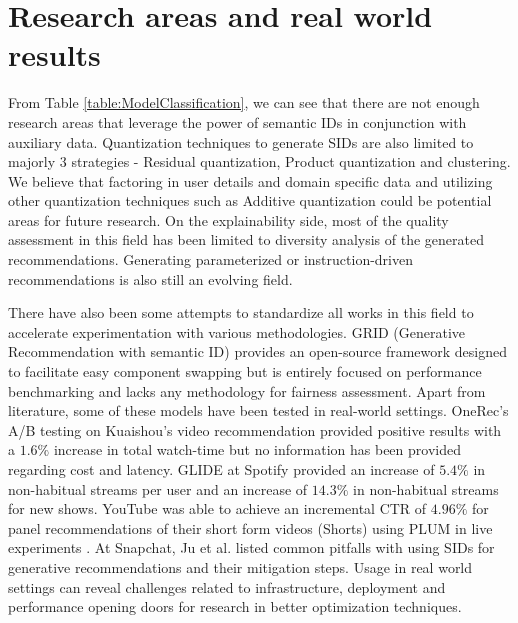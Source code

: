 \documentclass[11pt,a4paper]{article}
\begin{document}
\section{Research areas and real world results}
From Table \ref{table:ModelClassification}, we can see that there are not enough research areas that leverage the power of semantic IDs in conjunction with auxiliary data. Quantization techniques to generate SIDs are also limited to majorly 3 strategies - Residual quantization, Product quantization and clustering. We believe that factoring in user details and domain specific data and utilizing other quantization techniques such as Additive quantization could be potential areas for future research. On the explainability side, most of the quality assessment in this field has been limited to diversity analysis of the generated recommendations. Generating parameterized or instruction-driven recommendations is also still an evolving field.

There have also been some attempts to standardize all works in this field to accelerate experimentation with various methodologies. GRID (Generative Recommendation with semantic ID) \cite{2025GRID_ju2025generativerecommendationsemanticids} provides an open-source framework designed to facilitate easy component swapping but is entirely focused on performance benchmarking and lacks any methodology for fairness assessment. Apart from literature, some of these models have been tested in real-world settings. OneRec's A/B testing on Kuaishou’s video recommendation provided positive results with a $1.6\%$ increase in total watch-time but no information has been provided regarding cost and latency. GLIDE at Spotify provided an increase of $5.4\%$ in non-habitual streams per user and an increase of $14.3\%$ in non-habitual streams for new shows. YouTube was able to achieve an incremental CTR of $4.96\%$ for panel recommendations of their short form videos (Shorts) using PLUM in live experiments \cite{2025PLUM_he2025plumadaptingpretrainedlanguage, PLUM_tullieBlog}. At Snapchat, Ju et al. \cite{snapchat_ju2026semanticidsrecommendersystems} listed common pitfalls with using SIDs for generative recommendations and their mitigation steps. Usage in real world settings can reveal challenges related to infrastructure, deployment and performance opening doors for research in better optimization techniques.
\end{document}
